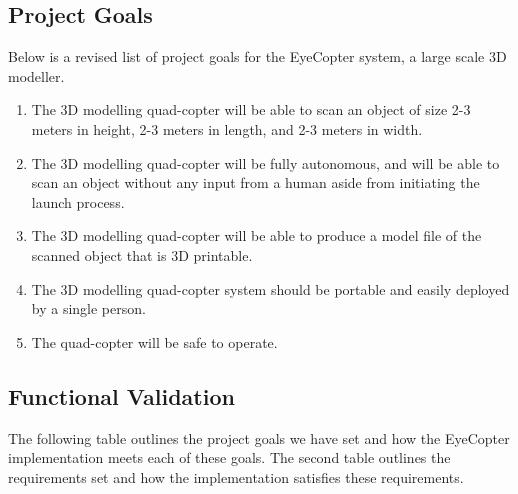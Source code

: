 \documentclass[10pt,letterpaper]{article}
\begin{document}
\subsection{Project Goals}
Below is a revised list of project goals for the EyeCopter system, a large scale 3D modeller. 
\begin{enumerate}
	\item The 3D modelling quad-copter will be able to scan an object of size 2-3 meters in height, 2-3 meters in length, and 2-3 meters in width. 
	\item The 3D modelling quad-copter will be fully autonomous, and will be able to scan an object without any input from a human aside from initiating the launch process.  
	\item The 3D modelling quad-copter will be able to produce a model file of the scanned object that is 3D printable.
	\item The 3D modelling quad-copter system should be portable and easily deployed by a single person.
    \item The quad-copter will be safe to operate.
\end{enumerate}

\newpage

\subsection{Functional Validation}
The following table outlines the project goals we have set and how the EyeCopter implementation meets each of these goals. The second table outlines the requirements set and how the implementation satisfies these requirements.
\end{document}
